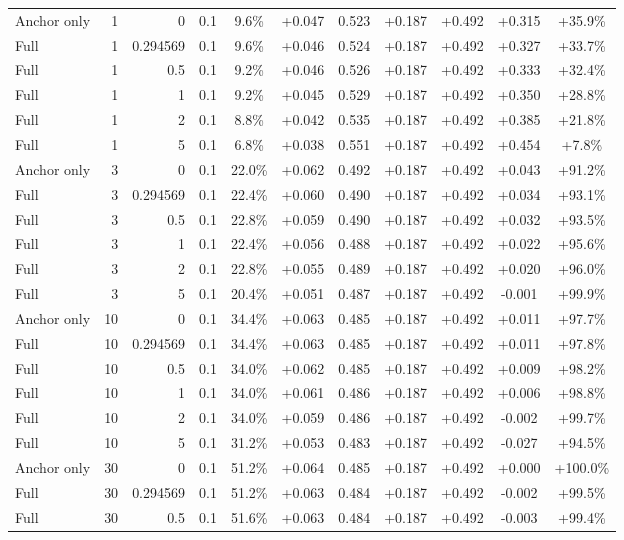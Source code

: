 \begin{table}[htbp]
\begin{tabular}{lrrrccccccc}
Anchor only & 1 & 0 & 0.1 & 9.6\% & +0.047 & 0.523 & +0.187 & +0.492 & +0.315 & +35.9\% \\
Full & 1 & 0.294569 & 0.1 & 9.6\% & +0.046 & 0.524 & +0.187 & +0.492 & +0.327 & +33.7\% \\
Full & 1 & 0.5 & 0.1 & 9.2\% & +0.046 & 0.526 & +0.187 & +0.492 & +0.333 & +32.4\% \\
Full & 1 & 1 & 0.1 & 9.2\% & +0.045 & 0.529 & +0.187 & +0.492 & +0.350 & +28.8\% \\
Full & 1 & 2 & 0.1 & 8.8\% & +0.042 & 0.535 & +0.187 & +0.492 & +0.385 & +21.8\% \\
Full & 1 & 5 & 0.1 & 6.8\% & +0.038 & 0.551 & +0.187 & +0.492 & +0.454 & +7.8\% \\
Anchor only & 3 & 0 & 0.1 & 22.0\% & +0.062 & 0.492 & +0.187 & +0.492 & +0.043 & +91.2\% \\
Full & 3 & 0.294569 & 0.1 & 22.4\% & +0.060 & 0.490 & +0.187 & +0.492 & +0.034 & +93.1\% \\
Full & 3 & 0.5 & 0.1 & 22.8\% & +0.059 & 0.490 & +0.187 & +0.492 & +0.032 & +93.5\% \\
Full & 3 & 1 & 0.1 & 22.4\% & +0.056 & 0.488 & +0.187 & +0.492 & +0.022 & +95.6\% \\
Full & 3 & 2 & 0.1 & 22.8\% & +0.055 & 0.489 & +0.187 & +0.492 & +0.020 & +96.0\% \\
Full & 3 & 5 & 0.1 & 20.4\% & +0.051 & 0.487 & +0.187 & +0.492 & -0.001 & +99.9\% \\
Anchor only & 10 & 0 & 0.1 & 34.4\% & +0.063 & 0.485 & +0.187 & +0.492 & +0.011 & +97.7\% \\
Full & 10 & 0.294569 & 0.1 & 34.4\% & +0.063 & 0.485 & +0.187 & +0.492 & +0.011 & +97.8\% \\
Full & 10 & 0.5 & 0.1 & 34.0\% & +0.062 & 0.485 & +0.187 & +0.492 & +0.009 & +98.2\% \\
Full & 10 & 1 & 0.1 & 34.0\% & +0.061 & 0.486 & +0.187 & +0.492 & +0.006 & +98.8\% \\
Full & 10 & 2 & 0.1 & 34.0\% & +0.059 & 0.486 & +0.187 & +0.492 & -0.002 & +99.7\% \\
Full & 10 & 5 & 0.1 & 31.2\% & +0.053 & 0.483 & +0.187 & +0.492 & -0.027 & +94.5\% \\
Anchor only & 30 & 0 & 0.1 & 51.2\% & +0.064 & 0.485 & +0.187 & +0.492 & +0.000 & +100.0\% \\
Full & 30 & 0.294569 & 0.1 & 51.2\% & +0.063 & 0.484 & +0.187 & +0.492 & -0.002 & +99.5\% \\
Full & 30 & 0.5 & 0.1 & 51.6\% & +0.063 & 0.484 & +0.187 & +0.492 & -0.003 & +99.4\% \\

\end{tabular}
\end{table}
